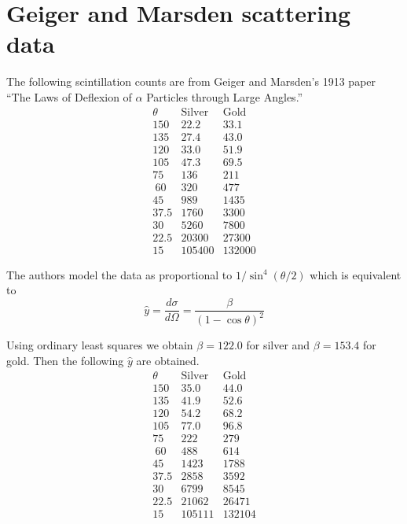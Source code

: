 

\section*{Geiger and Marsden scattering data}

The following scintillation counts are from Geiger and Marsden's 1913 paper
``The Laws of Deflexion of $\alpha$ Particles through Large Angles.''
\begin{equation*}
\begin{matrix}
\theta & \text{Silver} & \text{Gold}
\\[1ex]
150 & 22.2 & 33.1\\
135 & 27.4 & 43.0\\
120 & 33.0 & 51.9\\
105 & 47.3 & 69.5\\
75 & 136 & 211\\\
60 & 320 & 477\\
45 & 989 & 1435\\
37.5 & 1760 & 3300\\
30 & 5260 & 7800\\
22.5 & 20300 & 27300\\
15 & 105400 & 132000
\end{matrix}
\end{equation*}

The authors model the data as proportional to $1/\sin^4(\theta/2)$ which is equivalent to
\begin{equation*}
\hat y=\frac{d\sigma}{d\Omega}=\frac{\beta}{(1-\cos\theta)^2}
\end{equation*}

Using ordinary least squares we obtain
$\beta=122.0$ for silver and $\beta=153.4$ for gold.
Then the following $\hat y$ are obtained.
\begin{equation*}
\begin{matrix}
\theta & \text{Silver} & \text{Gold}
\\[1ex]
150 & 35.0 & 44.0\\
135 & 41.9 & 52.6\\
120 & 54.2 & 68.2\\
105 & 77.0 & 96.8\\
75 & 222 & 279\\\
60 & 488 & 614\\
45 & 1423 & 1788\\
37.5 & 2858 & 3592\\
30 & 6799 & 8545\\
22.5 & 21062 & 26471\\
15 & 105111 & 132104
\end{matrix}
\end{equation*}

